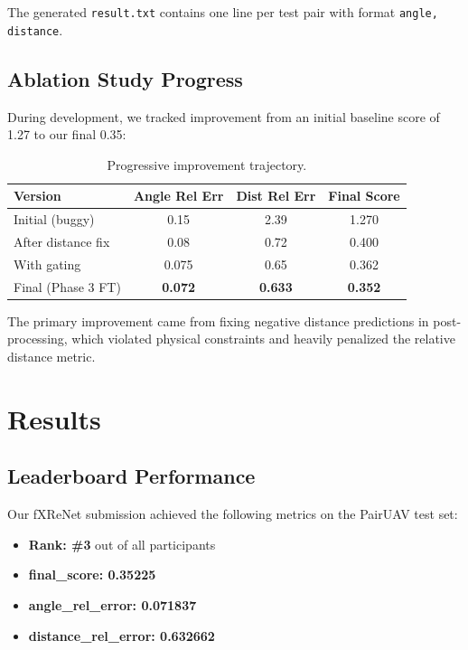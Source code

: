 \documentclass[sigconf,nonacm]{acmart}
\begin{document}
The generated \texttt{result.txt} contains one line per test pair with format \texttt{angle, distance}.

\subsection{Ablation Study Progress}

During development, we tracked improvement from an initial baseline score of 1.27 to our final 0.35:

\begin{table}[h]
\centering
\caption{Progressive improvement trajectory.}
\label{tab:improvement}
\begin{tabular}{lccc}
\toprule
Version & Angle Rel Err & Dist Rel Err & Final Score \\
\midrule
Initial (buggy) & 0.15 & 2.39 & 1.270 \\
After distance fix & 0.08 & 0.72 & 0.400 \\
With gating & 0.075 & 0.65 & 0.362 \\
Final (Phase 3 FT) & \textbf{0.072} & \textbf{0.633} & \textbf{0.352} \\
\bottomrule
\end{tabular}
\end{table}

The primary improvement came from fixing negative distance predictions in post-processing, which violated physical constraints and heavily penalized the relative distance metric.

\section{Results}

\subsection{Leaderboard Performance}

Our fXReNet submission achieved the following metrics on the PairUAV test set:

\begin{itemize}
    \item \textbf{Rank: \#3} out of all participants
    \item \textbf{final\_score: 0.35225}
    \item \textbf{angle\_rel\_error: 0.071837}
    \item \textbf{distance\_rel\_error: 0.632662}
\end{itemize}
\end{document}
